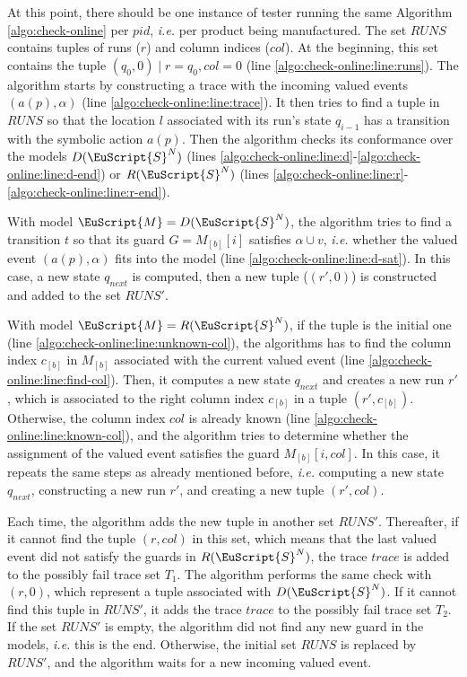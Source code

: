 At this point, there should be one instance of tester running the
same Algorithm \ref{algo:check-online} per $pid$, \emph{i.e.} per
product being manufactured. The set $RUNS$ contains tuples of
runs ($r$) and column indices ($col$). At the beginning, this set
contains the tuple $(q_0, 0) \mid r = q_0, col = 0$ (line
\ref{algo:check-online:line:runs}). The algorithm starts by
constructing a trace with the incoming valued events $(a(p),
\alpha)$ (line \ref{algo:check-online:line:trace}). It then tries
to find a tuple in $RUNS$ so that the location $l$ associated
with its run's state $q_{i-1}$ has a transition with the symbolic
action $a(p)$. Then the algorithm checks its conformance over the
models $D(\EuScript{S}^{N})$ (lines
\ref{algo:check-online:line:d}-\ref{algo:check-online:line:d-end})
or $R(\EuScript{S}^{N})$ (lines
\ref{algo:check-online:line:r}-\ref{algo:check-online:line:r-end}).

With model $\EuScript{M} = D(\EuScript{S}^{N})$, the algorithm
tries to find a transition $t$ so that its guard $G = M_{[b]}[i]$
satisfies $\alpha \cup v$, \emph{i.e.} whether the valued event
$(a(p), \alpha)$ fits into the model (line
\ref{algo:check-online:line:d-sat}). In this case, a new state
$q_{next}$ is computed, then a new tuple ($(r', 0)$) is
constructed and added to the set $RUNS'$.

With model $\EuScript{M} = R(\EuScript{S}^{N})$, if the tuple is
the initial one (line \ref{algo:check-online:line:unknown-col}),
the algorithms has to find the column index
$c_{[b]}$ in $M_{[b]}$ associated with the current valued event
(line \ref{algo:check-online:line:find-col}).  Then, it computes
a new state $q_{next}$ and creates a new run $r'$, which is
associated to the right column index $c_{[b]}$ in a tuple $(r',
c_{[b]})$.  Otherwise, the column index $col$ is already known
(line \ref{algo:check-online:line:known-col}), and the algorithm
tries to determine whether the assignment of the valued event
satisfies the guard $M_{[b]}[i, col]$. In this case, it repeats
the same steps as already mentioned before, \emph{i.e.} computing
a new state $q_{next}$, constructing a new run $r'$, and creating
a new tuple $(r', col)$.

Each time, the algorithm adds the new tuple in another set
$RUNS'$. Thereafter, if it cannot find the tuple $(r, col)$ in
this set, which means that the last valued event did not satisfy the
guards in $R(\EuScript{S}^{N})$, the trace $trace$ is added to
the possibly fail trace set $T_1$. The algorithm performs the
same check with $(r, 0)$, which represent a tuple associated with
$D(\EuScript{S}^{N})$. If it cannot find this tuple in $RUNS'$,
it adds the trace $trace$ to the possibly fail trace set $T_2$.
If the set $RUNS'$ is empty, the algorithm did not find any new
guard in the models, \emph{i.e.} this is the end. Otherwise, the
initial set $RUNS$ is replaced by $RUNS'$, and the algorithm
waits for a new incoming valued event.


